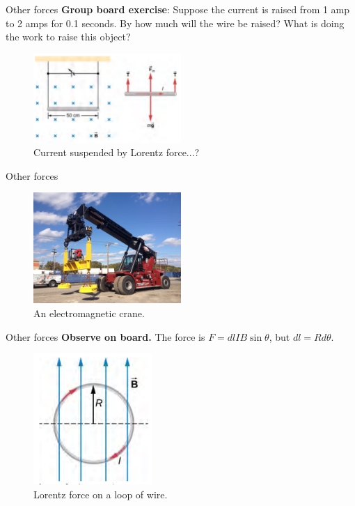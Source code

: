 \documentclass{beamer}
\begin{document}
\begin{frame}{Other forces}
\small
\textbf{Group board exercise}: Suppose the current is raised from 1 amp to 2 amps for 0.1 seconds.  By how much will the wire be raised?  What is doing the work to raise this object?
\begin{figure}
\centering
\includegraphics[width=0.5\textwidth]{figures/leads.png}
\caption{\label{fig:leads} Current suspended by Lorentz force...?}
\end{figure}
\end{frame}

\begin{frame}{Other forces}
\begin{figure}
\centering
\includegraphics[width=0.5\textwidth]{figures/crane.jpg}
\caption{\label{fig:crane} An electromagnetic crane.}
\end{figure}
\end{frame}

\begin{frame}{Other forces}
\textbf{Observe on board.} The force is $F = dl I B \sin\theta$, but $dl = Rd\theta$.
\begin{figure}
\centering
\includegraphics[width=0.4\textwidth,trim=0cm 0.1cm 0cm 0cm,clip=true]{figures/loop.png}
\caption{\label{fig:loop} Lorentz force on a loop of wire.}
\end{figure}
\end{frame}
\end{document}
